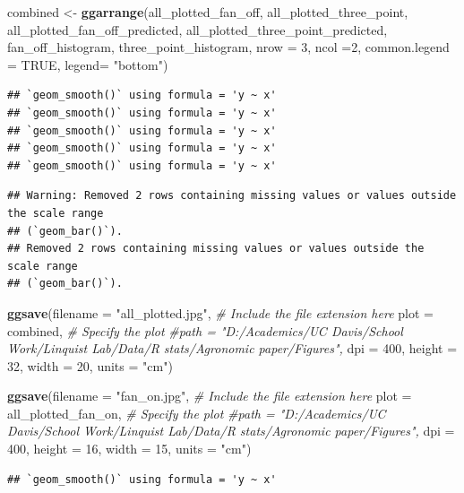 \documentclass[
]{article}
\newenvironment{Shaded}{\begin{snugshade}}{\end{snugshade}}
\newcommand{\AttributeTok}[1]{\textcolor[rgb]{0.13,0.29,0.53}{#1}}
\newcommand{\CommentTok}[1]{\textcolor[rgb]{0.56,0.35,0.01}{\textit{#1}}}
\newcommand{\ConstantTok}[1]{\textcolor[rgb]{0.56,0.35,0.01}{#1}}
\newcommand{\DecValTok}[1]{\textcolor[rgb]{0.00,0.00,0.81}{#1}}
\newcommand{\FunctionTok}[1]{\textcolor[rgb]{0.13,0.29,0.53}{\textbf{#1}}}
\newcommand{\NormalTok}[1]{#1}
\newcommand{\OtherTok}[1]{\textcolor[rgb]{0.56,0.35,0.01}{#1}}
\newcommand{\StringTok}[1]{\textcolor[rgb]{0.31,0.60,0.02}{#1}}
\begin{document}
\begin{Shaded}
\begin{Highlighting}[]
\NormalTok{combined }\OtherTok{\textless{}{-}} \FunctionTok{ggarrange}\NormalTok{(all\_plotted\_fan\_off,}
\NormalTok{                      all\_plotted\_three\_point,}
\NormalTok{                      all\_plotted\_fan\_off\_predicted,}
\NormalTok{                      all\_plotted\_three\_point\_predicted,}
\NormalTok{                      fan\_off\_histogram,}
\NormalTok{                      three\_point\_histogram,}
                 \AttributeTok{nrow =} \DecValTok{3}\NormalTok{,}
                 \AttributeTok{ncol =}\DecValTok{2}\NormalTok{,}
                 \AttributeTok{common.legend =} \ConstantTok{TRUE}\NormalTok{,}
                 \AttributeTok{legend=} \StringTok{"bottom"}\NormalTok{)}
\end{Highlighting}
\end{Shaded}

\begin{verbatim}
## `geom_smooth()` using formula = 'y ~ x'
## `geom_smooth()` using formula = 'y ~ x'
## `geom_smooth()` using formula = 'y ~ x'
## `geom_smooth()` using formula = 'y ~ x'
## `geom_smooth()` using formula = 'y ~ x'
\end{verbatim}

\begin{verbatim}
## Warning: Removed 2 rows containing missing values or values outside the scale range
## (`geom_bar()`).
## Removed 2 rows containing missing values or values outside the scale range
## (`geom_bar()`).
\end{verbatim}

\begin{Shaded}
\begin{Highlighting}[]
\FunctionTok{ggsave}\NormalTok{(}\AttributeTok{filename =} \StringTok{"all\_plotted.jpg"}\NormalTok{,  }\CommentTok{\# Include the file extension here}
       \AttributeTok{plot =}\NormalTok{ combined,              }\CommentTok{\# Specify the plot}
       \CommentTok{\#path = "D:/Academics/UC Davis/School Work/Linquist Lab/Data/R stats/Agronomic paper/Figures",}
       \AttributeTok{dpi =} \DecValTok{400}\NormalTok{,}
       \AttributeTok{height =} \DecValTok{32}\NormalTok{, }\AttributeTok{width =} \DecValTok{20}\NormalTok{, }\AttributeTok{units =} \StringTok{"cm"}\NormalTok{)}

\FunctionTok{ggsave}\NormalTok{(}\AttributeTok{filename =} \StringTok{"fan\_on.jpg"}\NormalTok{,  }\CommentTok{\# Include the file extension here}
       \AttributeTok{plot =}\NormalTok{ all\_plotted\_fan\_on,              }\CommentTok{\# Specify the plot}
       \CommentTok{\#path = "D:/Academics/UC Davis/School Work/Linquist Lab/Data/R stats/Agronomic paper/Figures",}
       \AttributeTok{dpi =} \DecValTok{400}\NormalTok{,}
       \AttributeTok{height =} \DecValTok{16}\NormalTok{, }\AttributeTok{width =} \DecValTok{15}\NormalTok{, }\AttributeTok{units =} \StringTok{"cm"}\NormalTok{)}
\end{Highlighting}
\end{Shaded}

\begin{verbatim}
## `geom_smooth()` using formula = 'y ~ x'
\end{verbatim}
\end{document}
